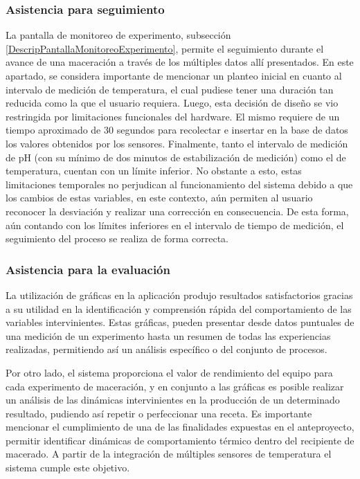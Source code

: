 \subsubsection{Asistencia para seguimiento}
\par La pantalla de monitoreo de experimento, subsección \ref{DescripPantallaMonitoreoExperimento}, permite el seguimiento durante el avance de una maceración a través de los múltiples datos allí presentados. En este apartado, se considera importante de mencionar un planteo inicial en cuanto al intervalo de medición de temperatura, el cual pudiese tener una duración tan reducida como la que el usuario requiera. Luego, esta decisión de diseño se vio restringida por limitaciones funcionales del hardware. El mismo requiere de un tiempo aproximado de 30 segundos para recolectar e insertar en la base de datos los valores obtenidos por los sensores. Finalmente, tanto el intervalo de medición de pH (con su mínimo de dos minutos de estabilización de medición) como el de temperatura, cuentan con un límite inferior. No obstante a esto, estas limitaciones temporales no perjudican al funcionamiento del sistema debido a que los cambios de estas variables, en este contexto, aún permiten al usuario reconocer la desviación y realizar una corrección en consecuencia. De esta forma, aún contando con los límites inferiores en el intervalo de tiempo de medición, el seguimiento del proceso se realiza de forma correcta.

\subsubsection{Asistencia para la evaluación}  
\par La utilización de gráficas en la aplicación produjo resultados satisfactorios gracias a su utilidad en la identificación y comprensión rápida del comportamiento de las variables intervinientes. Estas gráficas, pueden presentar desde datos puntuales de una medición de un experimento hasta un resumen de todas las experiencias realizadas, permitiendo así un análisis específico o del conjunto de procesos.

\par Por otro lado, el sistema proporciona el valor de rendimiento del equipo para cada experimento de maceración, y en conjunto a las gráficas es posible realizar un análisis de las dinámicas intervinientes en la producción de un determinado resultado, pudiendo así repetir o perfeccionar una receta.
Es importante mencionar el cumplimiento de una de las finalidades expuestas en el anteproyecto, permitir identificar dinámicas de comportamiento térmico dentro del recipiente de macerado. A partir de la integración de múltiples sensores de temperatura el sistema cumple este objetivo.


